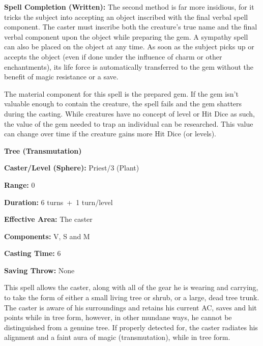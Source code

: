 \begin{multicols}{2}
\textbf{Spell Completion (Written):} The second method is far more insidious, for it tricks the subject into accepting an object inscribed with the final verbal spell component.  The caster must inscribe both the creature's true name and the final verbal component upon the object while preparing the gem.  A sympathy spell can also be placed on the object at any time.  As soon as the subject picks up or accepts the object (even if done under the influence of charm or other enchantments), its life force is automatically transferred to the gem without the benefit of magic resistance or a save.

The material component for this spell is the prepared gem.  If the gem isn't valuable enough to contain the creature, the spell fails and the gem shatters during the casting.  While creatures have no concept of level or Hit Dice as such, the value of the gem needed to trap an individual can be researched.  This value can change over time if the creature gains more Hit Dice (or levels).


\vspace{1em}

\noindent
\begin{minipage}{\columnwidth}

\noindent \textbf{Tree (Transmutation)}

\noindent \textbf{Caster/Level (Sphere):} Priest/3 (Plant)

\noindent \textbf{Range:} 0

\noindent \textbf{Duration:} 6 turns~+~1 turn/level

\noindent \textbf{Effective Area:} The caster

\noindent \textbf{Components:} V, S and M

\noindent \textbf{Casting Time:} 6

\noindent \textbf{Saving Throw:} None

\end{minipage}

This spell allows the caster, along with all of the gear he is wearing and carrying, to take the form of either a small living tree or shrub, or a large, dead tree trunk.  The caster is aware of his surroundings and retains his current AC, saves and hit points while in tree form, however, in other mundane ways, he cannot be distinguished from a genuine tree.  If properly detected for, the caster radiates his alignment and a faint aura of magic (transmutation), while in tree form.


\end{multicols}
